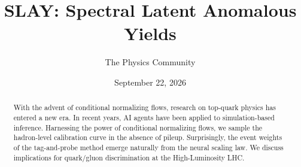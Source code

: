 \documentclass[11pt]{article}
\title{SLAY: Spectral Latent Anomalous Yields}
\author{The Physics Community}
\date{September 22, 2026}
\numberwithin{equation}{section}
\theoremstyle{definition}
\theoremstyle{remark}
\begin{document}
\maketitle
\begin{abstract}
With the advent of conditional normalizing flows, research on top-quark
physics has entered a new era. In recent years, AI agents have been
applied to simulation-based inference. Harnessing the power of
conditional normalizing flows, we sample the hadron-level calibration
curve in the absence of pileup. Surprisingly, the event weights of the
tag-and-probe method emerge naturally from the neural scaling law. We
discuss implications for quark/gluon discrimination at the
High-Luminosity LHC.
\end{abstract}
\tableofcontents




\nocite{*}


\end{document}
